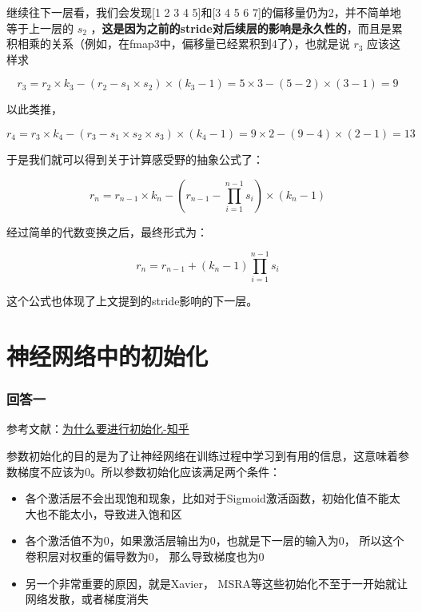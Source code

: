继续往下一层看，我们会发现[1 2 3 4 5]和[3 4 5 6 7]的偏移量仍为2，并不简单地等于上一层的 $s_2$ ，\textbf{这是因为之前的stride对后续层的影响是永久性的}，而且是累积相乘的关系（例如，在fmap3中，偏移量已经累积到4了），也就是说 $r_3$ 应该这样求 

\begin{displaymath}
r_3=r_2\times k_3-(r_2-s_1\times s_2)\times(k_3-1)=5\times3-(5-2)\times(3-1)=9 
\end{displaymath}

以此类推，

\begin{displaymath}
r_4=r_3\times k_4-(r_3-s_1\times s_2\times s_3)\times(k_4-1)=9\times2-(9-4)\times(2-1)=13 
\end{displaymath}


于是我们就可以得到关于计算感受野的抽象公式了： 

\begin{displaymath}
r_n=r_{n-1}\times k_n-(r_{n-1}-\prod_{i=1}^{n-1}s_i)\times(k_n-1) 
\end{displaymath}


经过简单的代数变换之后，最终形式为：

\begin{displaymath}
r_n=r_{n-1}+(k_n-1)\prod_{i=1}^{n-1}s_i 
\end{displaymath}

这个公式也体现了上文提到的stride影响的下一层。


\section{神经网络中的初始化}

\subsubsection{回答一}

参考文献：\href{https://www.zhihu.com/question/56526007}{为什么要进行初始化-知乎}

参数初始化的目的是为了让神经网络在训练过程中学习到有用的信息，这意味着参数梯度不应该为0。所以参数初始化应该满足两个条件：
\begin{itemize}
\item 各个激活层不会出现饱和现象，比如对于Sigmoid激活函数，初始化值不能太大也不能太小，导致进入饱和区
\item 各个激活值不为0，如果激活层输出为0，也就是下一层的输入为0， 所以这个卷积层对权重的偏导数为0， 那么导致梯度也为0
\item 另一个非常重要的原因，就是Xavier， MSRA等这些初始化不至于一开始就让网络发散，或者梯度消失
\end{itemize}

